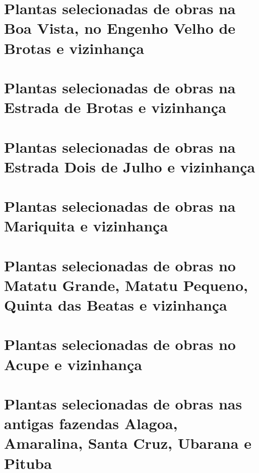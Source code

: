 \begin{anexosenv}


\chapter{Plantas selecionadas de obras na Boa Vista, no Engenho Velho de Brotas e vizinhança}



\chapter{Plantas selecionadas de obras na Estrada de Brotas e vizinhança}



\chapter{Plantas selecionadas de obras na Estrada Dois de Julho e vizinhança}



\chapter{Plantas selecionadas de obras na Mariquita e vizinhança}



\chapter{Plantas selecionadas de obras no Matatu Grande, Matatu Pequeno, Quinta das Beatas e vizinhança}



\chapter{Plantas selecionadas de obras no Acupe e vizinhança}



\chapter{Plantas selecionadas de obras nas antigas fazendas Alagoa, Amaralina, Santa Cruz, Ubarana e Pituba}\label{cap:anexosamaralina}


\end{anexosenv}
